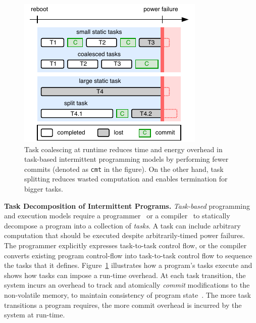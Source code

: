 \begin{figure} %
    \centering
    \includegraphics[width=\columnwidth]{figures/intro-figure-tiny.pdf}
    \caption{Task coalescing at runtime reduces time and energy overhead in task-based intermittent programming models by performing fewer commits (denoted as \texttt{cmt} in the figure). On the other hand, task splitting reduces wasted computation and enables termination for bigger tasks.}
    \label{fig:coalesce}
\end{figure}

\textbf{Task Decomposition of Intermittent Programs.} {\em
Task-based} programming and execution models require a
programmer~\cite{alpaca,chain} or a compiler~\cite{baghsorkhi_cgo_2018} to
statically decompose a program into a collection of {\em tasks}.  A task can
include arbitrary computation that should be executed despite arbitrarily-timed power failures.
%
The programmer explicitly expresses task-to-task control flow, or the compiler
converts existing program control-flow into task-to-task control flow to sequence
the tasks that it defines.
%
Figure~\ref{fig:coalesce} illustrates how a program's tasks execute and
shows how tasks can impose a run-time overhead. At each task transition, the system incurs an overhead to track and atomically \emph{commit} modifications to the non-volatile memory, to maintain consistency of program state~\cite{chain,alpaca}. The more task transitions a program requires, the more commit overhead is incurred by the system at run-time.

